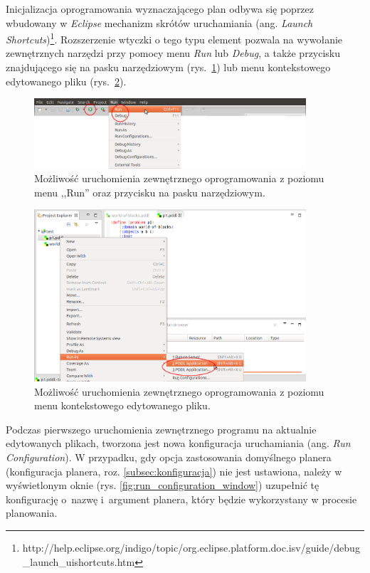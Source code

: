 Inicjalizacja oprogramowania wyznaczającego plan odbywa się poprzez wbudowany w \emph{Eclipse} mechanizm skrótów uruchamiania (ang. \textit{Launch Shortcuts})\footnote{http://help.eclipse.org/indigo/topic/org.eclipse.platform.doc.isv/guide/debug\_launch\_uishortcuts.htm}. Rozszerzenie wtyczki o tego typu element pozwala na wywołanie zewnętrznych narzędzi przy pomocy menu \emph{Run} lub \emph{Debug}, a także przycisku znajdującego się na pasku narzędziowym (rys.~\ref{fig:running_options_menu_toolbar}) lub menu kontekstowego edytowanego pliku (rys.~\ref{fig:running_options_context_menu}).
\begin{figure}[h!]
    \centering
    \includegraphics[width=0.9\textwidth]{img/running_options_menu_toolbar}
    \caption{Możliwość uruchomienia zewnętrznego oprogramowania z poziomu menu ,,Run'' oraz przycisku na pasku narzędziowym.}
    \label{fig:running_options_menu_toolbar}
\end{figure}

\begin{figure}[h!]
    \centering
    \includegraphics[width=0.9\textwidth]{img/running_options_context_menu}
    \caption{Możliwość uruchomienia zewnętrznego oprogramowania z poziomu menu kontekstowego edytowanego pliku.}
    \label{fig:running_options_context_menu}
\end{figure}

Podczas pierwszego uruchomienia zewnętrznego programu na aktualnie edytowanych plikach, tworzona jest nowa konfiguracja uruchamiania (ang. \textit{Run Configuration}). W przypadku, gdy opcja zastosowania domyślnego planera (konfiguracja planera, roz. \ref{subsec:konfiguracja}) nie jest ustawiona, należy w wyświetlonym oknie (rys. \ref{fig:run_configuration_window}) uzupełnić tę konfigurację o~nazwę i~argument planera, który będzie wykorzystany w procesie planowania. 

